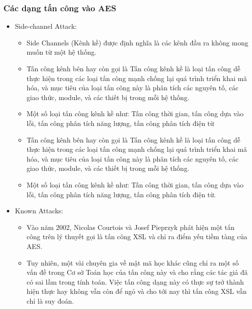 \subsubsection{Các dạng tấn công vào AES}
\begin{itemize}
    \item Side-channel Attack:
    \begin{itemize}
        \item Side Channels (Kênh kề) được định nghĩa là các kênh đầu ra không mong muốn từ một hệ thống.
        \item Tấn công kênh bên hay còn gọi là Tấn công kênh kề là loại tấn công dễ thực hiện trong các loại tấn công mạnh chống lại quá trình triển khai mã hóa, và mục tiêu của loại tấn công này là phân tích các nguyên tố, các giao thức, module, và các thiết bị trong mỗi hệ thống.
        \item Một số loại tấn công kênh kề như: Tấn công thời gian, tấn công dựa vào lỗi, tấn công phân tích năng lượng, tấn công phân tích điện từ
        \item Tấn công kênh bên hay còn gọi là Tấn công kênh kề là loại tấn công dễ thực hiện trong các loại tấn công mạnh chống lại quá trình triển khai mã hóa, và mục tiêu của loại tấn công này là phân tích các nguyên tố, các giao thức, module, và các thiết bị trong mỗi hệ thống.
        \item Một số loại tấn công kênh kề như: Tấn công thời gian, tấn công dựa vào lỗi, tấn công phân tích năng lượng, tấn công phân tích điện từ.
    \end{itemize}

    \item Known Attacks:
    \begin{itemize}
        \item Vào năm 2002, Nicolas Courtois và Josef Pieprzyk phát hiện một tấn công trên lý thuyết gọi là tấn công XSL và chỉ ra điểm yếu tiềm tàng của AES.
        \item Tuy nhiên, một vài chuyên gia về mật mã học khác cũng chỉ ra một số vấn đề trong Cơ sở Toán học của tấn công này và cho rằng các tác giả đã có sai lầm trong tính toán. Việc tấn công dạng này có thực sự trở thành hiện thực hay không vẫn còn để ngỏ và cho tới nay thì tấn công XSL vẫn chỉ là suy đoán.
    \end{itemize}
\end{itemize}

